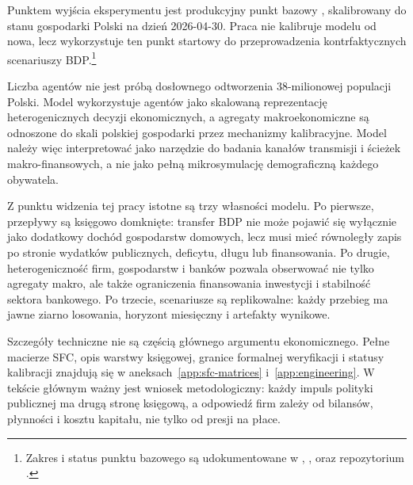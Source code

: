 Punktem wyjścia eksperymentu jest produkcyjny punkt bazowy \amor{}, skalibrowany do stanu gospodarki Polski na dzień 2026-04-30. Praca nie kalibruje modelu od nowa, lecz wykorzystuje ten punkt startowy do przeprowadzenia kontrfaktycznych scenariuszy BDP.\footnote{Zakres i status punktu bazowego są udokumentowane w , ,  oraz  repozytorium \amor{}.}

Liczba agentów nie jest próbą dosłownego odtworzenia 38-milionowej populacji Polski. Model wykorzystuje agentów jako skalowaną reprezentację heterogenicznych decyzji ekonomicznych, a agregaty makroekonomiczne są odnoszone do skali polskiej gospodarki przez mechanizmy kalibracyjne. Model należy więc interpretować jako narzędzie do badania kanałów transmisji i ścieżek makro-finansowych, a nie jako pełną mikrosymulację demograficzną każdego obywatela.

Z punktu widzenia tej pracy istotne są trzy własności modelu. Po pierwsze, przepływy są księgowo domknięte: transfer BDP nie może pojawić się wyłącznie jako dodatkowy dochód gospodarstw domowych, lecz musi mieć równoległy zapis po stronie wydatków publicznych, deficytu, długu lub finansowania. Po drugie, heterogeniczność firm, gospodarstw i banków pozwala obserwować nie tylko agregaty makro, ale także ograniczenia finansowania inwestycji i stabilność sektora bankowego. Po trzecie, scenariusze są replikowalne: każdy przebieg ma jawne ziarno losowania, horyzont miesięczny i artefakty wynikowe.

Szczegóły techniczne nie są częścią głównego argumentu ekonomicznego. Pełne macierze SFC, opis warstwy księgowej, granice formalnej weryfikacji i statusy kalibracji znajdują się w aneksach~\ref{app:sfc-matrices} i~\ref{app:engineering}. W tekście głównym ważny jest wniosek metodologiczny: każdy impuls polityki publicznej ma drugą stronę księgową, a odpowiedź firm zależy od bilansów, płynności i kosztu kapitału, nie tylko od presji na płace.
